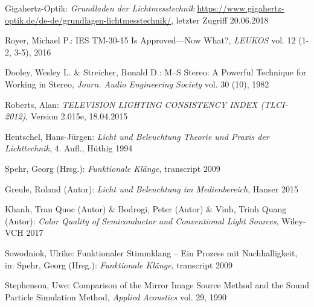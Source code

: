 \begin{thebibliography}{}
Gigahertz-Optik:
\emph{\glqq Grundladen der Lichtmesstechnik\grqq}
\url{https://www.gigahertz-optik.de/de-de/grundlagen-lichtmesstechnik/}, letzter Zugriff 20.06.2018



Royer, Michael P.:
\glqq IES TM-30-15 Is Approved—Now What?\grqq, 
\emph{LEUKOS} vol. 12 (1-2, 3-5), 2016


Dooley, Wesley L.  \& Streicher, Ronald D.:
\glqq M--S Stereo: A Powerful Technique for Working in Stereo\grqq, 
\emph{Journ. Audio Engineering Society} vol. 30 (10), 1982

Roberts, Alan: 
\emph{TELEVISION LIGHTING CONSISTENCY INDEX (TLCI-2012)}, Version 2.015e, 18.04.2015

Hentschel, Hans-Jürgen: 
\emph{Licht und Beleuchtung Theorie und Praxis der Lichttechnik}, 4. Aufl., Hüthig 1994

Spehr, Georg (Hrsg.): 
\emph{Funktionale Klänge}, transcript 2009

Greule, Roland (Autor):
\emph{Licht und Beleuchtung im Medienbereich}, Hanser 2015 

Khanh, Tran Quoc (Autor) \& Bodrogi, Peter (Autor) \& Vinh, Trinh Quang (Autor):
\emph{Color Quality of Semiconductor and Conventional Light Sources}, Wiley-VCH 2017


Sowodniok, Ulrike: 
\glqq Funktionaler Stimmklang -- Ein Prozess mit Nachhalligkeit\grqq, 
in: Spehr, Georg (Hrsg.): \emph{Funktionale Klänge}, transcript 2009




Stephenson, Uwe: 
\glqq Comparison of the Mirror Image Source Method and the Sound Particle Simulation Method\grqq, 
\emph{Applied Acoustics} vol. 29, 1990


\end{thebibliography}

\clearpage\thispagestyle{empty}
\eigen  %












